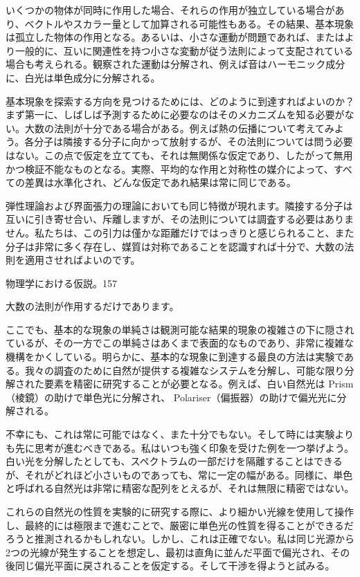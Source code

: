 \documentclass[a4paper,11pt,openany]{ltjsbook}
\begin{document}
いくつかの物体が同時に作用した場合、それらの作用が独立している場合があり、ベクトルやスカラー量として加算される可能性もある。その結果、基本現象は孤立した物体の作用となる。あるいは、小さな運動が問題であれば、またはより一般的に、互いに関連性を持つ小さな変動が従う法則によって支配されている場合も考えられる。観察された運動は分解され、例えば音はハーモニック成分に、白光は単色成分に分解される。

基本現象を探索する方向を見つけるためには、どのように到達すればよいのか？まず第一に、しばしば予測するために必要なのはそのメカニズムを知る必要がない。大数の法則が十分である場合がある。例えば熱の伝播について考えてみよう。各分子は隣接する分子に向かって放射するが、その法則については問う必要はない。この点で仮定を立てても、それは無関係な仮定であり、したがって無用かつ検証不能なものとなる。実際、平均的な作用と対称性の媒介によって、すべての差異は水準化され、どんな仮定であれ結果は常に同じである。

弾性理論および界面張力の理論においても同じ特徴が現れます。隣接する分子は互いに引き寄せ合い、斥離しますが、その法則については調査する必要はありません。私たちは、この引力は僅かな距離だけではっきりと感じられること、また分子は非常に多く存在し、媒質は対称であることを認識すれば十分で、大数の法則を適用させればよいのです。

物理学における仮説。157

大数の法則が作用するだけであります。

ここでも、基本的な現象の単純さは観測可能な結果的現象の複雑さの下に隠されているが、その一方でこの単純さはあくまで表面的なものであり、非常に複雑な機構をかくしている。明らかに、基本的な現象に到達する最良の方法は実験である。我々の調査のために自然が提供する複雑なシステムを分解し、可能な限り分解された要素を精密に研究することが必要となる。例えば、白い自然光は Prism（棱鏡）の助けで単色光に分解され、 Polariser（偏振器）の助けで偏光光に分解される。

不幸にも、これは常に可能ではなく、また十分でもない。そして時には実験よりも先に思考が進むべきである。私はいつも強く印象を受けた例を一つ挙げよう。白い光を分解したとしても、スペクトラムの一部だけを隔離することはできるが、それがどれほど小さいものであっても、常に一定の幅がある。同様に、単色と呼ばれる自然光は非常に精密な配列をとえるが、それは無限に精密ではない。

これらの自然光の性質を実験的に研究する際に、より細かい光線を使用して操作し、最終的には極限まで進むことで、厳密に単色光の性質を得ることができるだろうと推測されるかもしれない。しかし、これは正確でない。私は同じ光源から2つの光線が発生することを想定し、最初は直角に並んだ平面で偏光され、その後同じ偏光平面に戻されることを仮定する。そして干渉を得ようと試みる。
\end{document}
